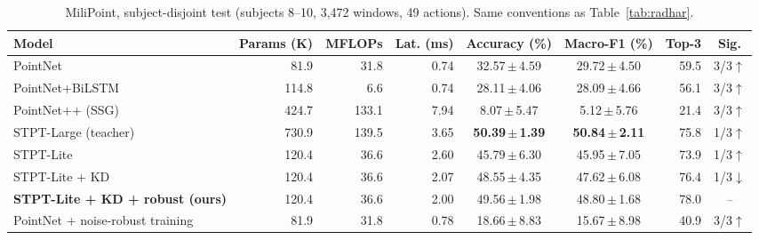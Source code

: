 \begin{table}[t]
\centering
\caption{MiliPoint, subject-disjoint test (subjects 8--10, 3{,}472 windows, 49 actions). Same conventions as Table~\ref{tab:radhar}.}
\label{tab:milipoint}
\setlength{\tabcolsep}{5pt}
\begin{tabular}{lrrrccrc}
\toprule
Model & Params (K) & MFLOPs & Lat. (ms) & Accuracy (\%) & Macro-F1 (\%) & Top-3 & Sig. \\
\midrule
PointNet & 81.9 & 31.8 & 0.74 & 32.57\,$\pm$\,4.59 & 29.72\,$\pm$\,4.50 & 59.5 & 3/3$\uparrow$ \\
PointNet+BiLSTM & 114.8 & 6.6 & 0.74 & 28.11\,$\pm$\,4.06 & 28.09\,$\pm$\,4.66 & 56.1 & 3/3$\uparrow$ \\
PointNet++ (SSG) & 424.7 & 133.1 & 7.94 & 8.07\,$\pm$\,5.47 & 5.12\,$\pm$\,5.76 & 21.4 & 3/3$\uparrow$ \\
STPT-Large (teacher) & 730.9 & 139.5 & 3.65 & \textbf{50.39\,$\pm$\,1.39} & \textbf{50.84\,$\pm$\,2.11} & 75.8 & 1/3$\uparrow$ \\
STPT-Lite & 120.4 & 36.6 & 2.60 & 45.79\,$\pm$\,6.30 & 45.95\,$\pm$\,7.05 & 73.9 & 1/3$\uparrow$ \\
STPT-Lite + KD & 120.4 & 36.6 & 2.07 & 48.55\,$\pm$\,4.35 & 47.62\,$\pm$\,6.08 & 76.4 & 1/3$\downarrow$ \\
\textbf{STPT-Lite + KD + robust (ours)} & 120.4 & 36.6 & 2.00 & 49.56\,$\pm$\,1.98 & 48.80\,$\pm$\,1.68 & 78.0 & -- \\
PointNet + noise-robust training & 81.9 & 31.8 & 0.78 & 18.66\,$\pm$\,8.83 & 15.67\,$\pm$\,8.98 & 40.9 & 3/3$\uparrow$ \\
\bottomrule
\end{tabular}
\end{table}